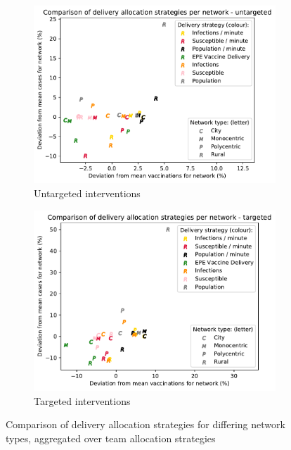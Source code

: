 \documentclass[10pt,letterpaper]{article}
\begin{document}
\begin{figure}[ht!]
  \begin{subfigure}[b]{0.5\textwidth}
    \includegraphics[width=\textwidth]{figures/strategies/vacc_strategy_scatter_by_network_untargeted.pdf}
    \caption{Untargeted interventions}
    \label{fig:vacc_scatter_unt}
  \end{subfigure}
  \begin{subfigure}[b]{0.5\textwidth}
    \includegraphics[width=\textwidth]{figures/strategies/vacc_strategy_scatter_by_network_targeted.pdf}
    \caption{Targeted interventions}
    \label{fig:vacc_scatter_tar}
  \end{subfigure}
  \caption{Comparison of delivery allocation strategies for differing network types, aggregated over team allocation strategies}
\end{figure}
\end{document}
